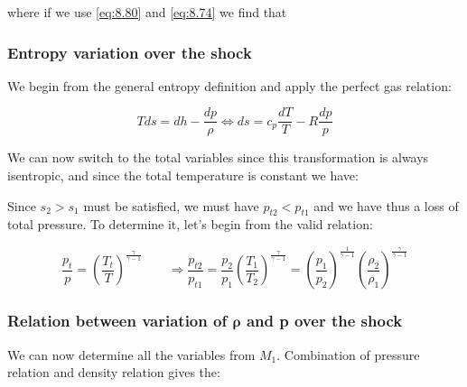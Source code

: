 	where if we use \eqref{eq:8.80} and \eqref{eq:8.74} we find that 
	
	\begin{center}
	\end{center}
	
\subsubsection{Entropy variation over the shock}
	We begin from the general entropy definition and apply the perfect gas relation: 
	
	\begin{equation}
	T ds = dh - \frac{dp}{\rho} \Leftrightarrow ds = c_p \frac{dT}{T} - R\frac{dp}{p}
	\end{equation}
	
	We can now switch to the total variables since this transformation is always isentropic, and since the total temperature is constant we have: 
	
	\begin{center}
	\end{center}
	
	Since $s_2>s_1$ must be satisfied, we must have $p_{t2}<p_{t1}$ and we have thus a loss of total pressure. To determine it, let's begin from the valid relation:
	
	\begin{equation}
	\frac{p_t}{p} = \left(\frac{T_t}{T} \right)^{\frac{\gamma}{\gamma -1}} \qquad \Rightarrow \frac{p_{t2}}{p_{t1}} = \frac{p_2}{p_1}\left(\frac{T_1}{T_2} \right)^{\frac{\gamma}{\gamma -1}} = \left(\frac{p_1}{p_2} \right)^{\frac{1}{\gamma -1}}\left(\frac{\rho _2}{\rho _1} \right)^{\frac{\gamma}{\gamma -1}}
	\end{equation}
	
\subsubsection{Relation between variation of $\bm{\rho}$ and p over the shock}
	We can now determine all the variables from $M_1$. Combination of pressure relation and density relation gives the: 
	
